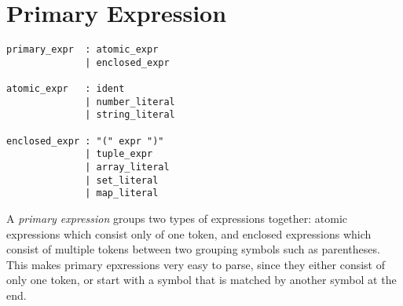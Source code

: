 \section{Primary Expression}

\begin{lstlisting}[language=EBNF]
primary_expr  : atomic_expr
              | enclosed_expr

atomic_expr   : ident
              | number_literal
              | string_literal

enclosed_expr : "(" expr ")"
              | tuple_expr
              | array_literal
              | set_literal
              | map_literal
\end{lstlisting}

A \emph{primary expression} groups two types of expressions together: atomic
expressions which consist only of one token, and enclosed expressions which
consist of multiple tokens between two grouping symbols such as parentheses.
This makes primary epxressions very easy to parse, since they either consist of
only one token, or start with a symbol that is matched by another symbol at the
end.
